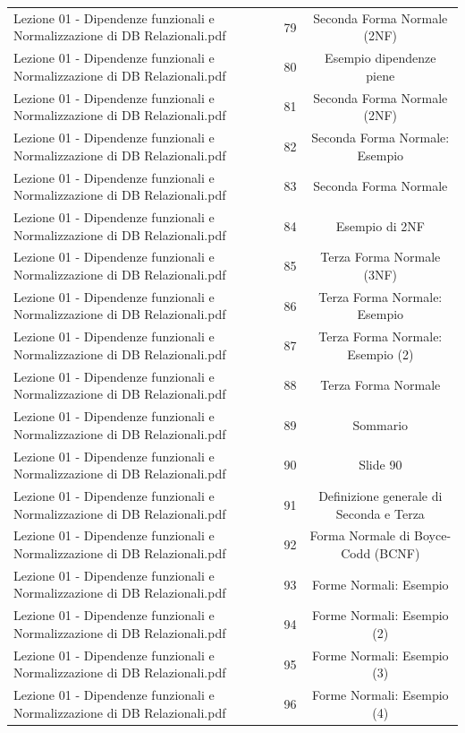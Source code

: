 \documentclass[11pt]{article}
\begin{document}
\begin{longtable}{@{}p{}cc@{}}
Lezione 01 - Dipendenze funzionali e Normalizzazione di DB Relazionali.pdf & 79 & Seconda Forma Normale (2NF) \\
Lezione 01 - Dipendenze funzionali e Normalizzazione di DB Relazionali.pdf & 80 & Esempio dipendenze piene \\
Lezione 01 - Dipendenze funzionali e Normalizzazione di DB Relazionali.pdf & 81 & Seconda Forma Normale (2NF) \\
Lezione 01 - Dipendenze funzionali e Normalizzazione di DB Relazionali.pdf & 82 & Seconda Forma Normale: Esempio \\
Lezione 01 - Dipendenze funzionali e Normalizzazione di DB Relazionali.pdf & 83 & Seconda Forma Normale \\
Lezione 01 - Dipendenze funzionali e Normalizzazione di DB Relazionali.pdf & 84 & Esempio di 2NF \\
Lezione 01 - Dipendenze funzionali e Normalizzazione di DB Relazionali.pdf & 85 & Terza Forma Normale (3NF) \\
Lezione 01 - Dipendenze funzionali e Normalizzazione di DB Relazionali.pdf & 86 & Terza Forma Normale: Esempio \\
Lezione 01 - Dipendenze funzionali e Normalizzazione di DB Relazionali.pdf & 87 & Terza Forma Normale: Esempio (2) \\
Lezione 01 - Dipendenze funzionali e Normalizzazione di DB Relazionali.pdf & 88 & Terza Forma Normale \\
Lezione 01 - Dipendenze funzionali e Normalizzazione di DB Relazionali.pdf & 89 & Sommario \\
Lezione 01 - Dipendenze funzionali e Normalizzazione di DB Relazionali.pdf & 90 & Slide 90 \\
Lezione 01 - Dipendenze funzionali e Normalizzazione di DB Relazionali.pdf & 91 & Definizione generale di Seconda e Terza \\
Lezione 01 - Dipendenze funzionali e Normalizzazione di DB Relazionali.pdf & 92 & Forma Normale di Boyce-Codd (BCNF) \\
Lezione 01 - Dipendenze funzionali e Normalizzazione di DB Relazionali.pdf & 93 & Forme Normali: Esempio \\
Lezione 01 - Dipendenze funzionali e Normalizzazione di DB Relazionali.pdf & 94 & Forme Normali: Esempio (2) \\
Lezione 01 - Dipendenze funzionali e Normalizzazione di DB Relazionali.pdf & 95 & Forme Normali: Esempio (3) \\
Lezione 01 - Dipendenze funzionali e Normalizzazione di DB Relazionali.pdf & 96 & Forme Normali: Esempio (4) \\

\end{longtable}
\end{document}
